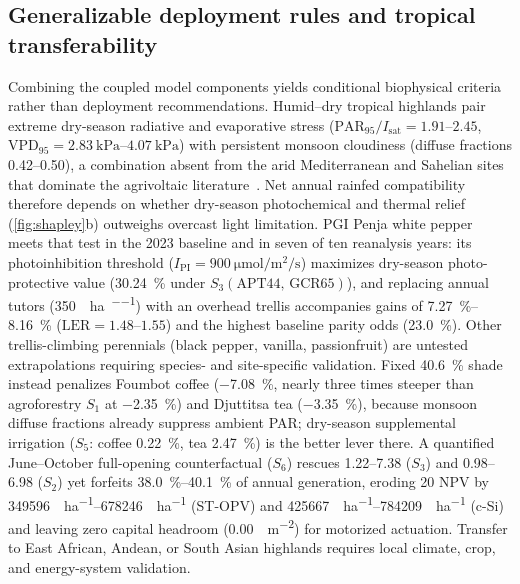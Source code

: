 \documentclass[preprint,12pt,a4paper]{elsarticle}
\begin{document}
\subsection{Generalizable deployment rules and tropical transferability}
\label{sec:disc_mech}

Combining the coupled model components yields conditional biophysical criteria rather than deployment recommendations. Humid--dry tropical highlands pair extreme dry-season radiative and evaporative stress ($\mathrm{PAR}_{95}/I_{\mathrm{sat}} = \numrange{1.91}{2.45}$, $\mathrm{VPD}_{95} = \qtyrange{2.83}{4.07}{\kilo\pascal}$) with persistent monsoon cloudiness (diffuse fractions \numrange{0.42}{0.50}), a combination absent from the arid Mediterranean and Sahelian sites that dominate the agrivoltaic literature~\cite{Elamri2018,Asaa2024}. Net annual rainfed compatibility therefore depends on whether dry-season photochemical and thermal relief (\cref{fig:shapley}b) outweighs overcast light limitation. PGI Penja white pepper meets that test in the 2023 baseline and in seven of ten reanalysis years: its photoinhibition threshold ($I_{\mathrm{PI}}=\qty{900}{\micro\mole\per\square\meter\per\second}$) maximizes dry-season photo-protective value (\qty{+30.24}{\percent} under $S_3(\mathrm{APT44,\,GCR65})$), and replacing annual tutors (\qty{350}{\USD\per\hectare\per\yr}) with an overhead trellis accompanies gains of \qtyrange{+7.27}{+8.16}{\percent} ($\mathrm{LER}=\numrange{1.48}{1.55}$) and the highest baseline parity odds (\qty{23.0}{\percent}). Other trellis-climbing perennials (black pepper, vanilla, passionfruit) are untested extrapolations requiring species- and site-specific validation. Fixed \qty{40.6}{\percent} shade instead penalizes Foumbot coffee (\qty{-7.08}{\percent}, nearly three times steeper than agroforestry $S_1$ at \qty{-2.35}{\percent}) and Djuttitsa tea (\qty{-3.35}{\percent}), because monsoon diffuse fractions already suppress ambient PAR; dry-season supplemental irrigation ($S_5$: coffee \qty{+0.22}{\percent}, tea \qty{+2.47}{\percent}) is the better lever there. A quantified June--October full-opening counterfactual ($S_6$) rescues \qtyrange{+1.22}{+7.38}{\pp} ($S_3$) and \qtyrange{+0.98}{+6.98}{\pp} ($S_2$) yet forfeits \qtyrange{38.0}{40.1}{\percent} of annual generation, eroding \qty{20}{\yr} NPV by \qtyrange{349596}{678246}{\USD\per\hectare} (ST-OPV) and \qtyrange{425667}{784209}{\USD\per\hectare} (c-Si) and leaving zero capital headroom (\qty{0.00}{\USD\per\square\meter}) for motorized actuation. Transfer to East African, Andean, or South Asian highlands requires local climate, crop, and energy-system validation.
\end{document}
